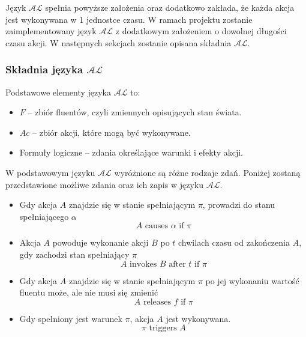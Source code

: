 \documentclass{article}
\begin{document}
\noindent Język $\mathcal{AL}$ spełnia powyższe założenia oraz dodatkowo zakłada, że każda akcja jest wykonywana w 1 jednostce czasu. W ramach projektu zostanie zaimplementowany język $\mathcal{AL}$ z dodatkowym założeniem o dowolnej długości czasu akcji. W następnych sekcjach zostanie opisana składnia $\mathcal{AL}$.

\subsubsection{Składnia języka $\mathcal{AL}$}

Podstawowe elementy języka $\mathcal{AL}$ to:
\begin{itemize}
    \item $F$ – zbiór fluentów, czyli zmiennych opisujących stan świata.
    \item $Ac$ – zbiór akcji, które mogą być wykonywane.
    \item Formuły logiczne – zdania określające warunki i efekty akcji.
\end{itemize}

\noindent W podstawowym języku $\mathcal{AL}$ wyróżnione są różne rodzaje zdań. Poniżej zostaną przedstawione możliwe zdania oraz ich zapis w języku $\mathcal{AL}$.
\begin{itemize}
    \item Gdy akcja $A$ znajdzie się w stanie spełniającym $\pi$, prowadzi do stanu spełniającego $\alpha$
    \begin{equation}
     A \text{ causes } \alpha \text{ if } \pi
    \end{equation}

    \item Akcja $A$ powoduje wykonanie akcji $B$ po $t$ chwilach czasu od zakończenia $A$, gdy zachodzi stan spełniający $\pi$
    \begin{equation}
        A \text{ invokes } B \text{ after } t \text{ if } \pi
    \end{equation}

    \item Gdy akcja $A$ znajdzie się w stanie spełniającym $\pi$ po jej wykonaniu wartość fluentu może, ale nie musi się zmienić
    \begin{equation}
        A \text{ releases } f \text{ if } \pi
    \end{equation}

    \item Gdy spełniony jest warunek $\pi$, akcja $A$ jest wykonywana.
    \begin{equation}
        \pi \text{ triggers } A
    \end{equation}
\end{itemize}
\end{document}
